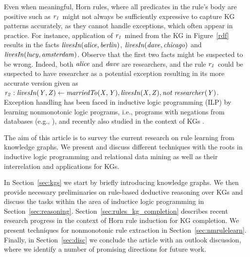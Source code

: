 Even when meaningful, Horn rules, where all predicates in the rule's body are positive such as $\mathit{r_1}$ might not always be sufficiently expressive to capture KG patterns accurately, as they cannot handle exceptions, which often appear in practice. 
For instance, application of $\mathit{r_1}$ mined from the KG in Figure~\ref{rdf} results in the facts $\mathit{livesIn(alice,berlin)}$, $\mathit{livesIn(dave,chicago)}$ and $\mathit{livesIn(lucy,amsterdam)}$. Observe that the first two facts might be suspected to be wrong. Indeed, both $\mathit{alice}$ and $\mathit{dave}$ are researchers, and the rule $\mathit{r_1}$ could be suspected to have researcher as a potential exception resulting in its more accurate version given as $\mathit{r_2:\;}\mathit{livesIn(Y,Z)}\leftarrow \mathit{marriedTo(X,Y),livesIn(X,Z), not\;researcher(Y)}$.
Exception handling has been faced in inductive logic programming (ILP) by learning nonmonotonic logic programs, i.e., programs with negations from databases (e.g., \cite{DBLP:conf/ijcai/InoueK97,DBLP:journals/tocl/Sakama05,XHAIL}), and recently also studied in the context of KGs \cite{gad2016,rumis}.


The aim of this article is to survey the current research on rule learning from knowledge graphs. We present and discuss different techniques with the roots in inductive logic programming and relational data mining as well as their interrelation and applications for KGs. 

In Section~\ref{sec:kgs} we start by briefly introducing knowledge graphs. We then provide necessary preliminaries on rule-based deductive reasoning over KGs and discuss the tasks within the area of inductice logic programming in Section~\ref{sec:reasoning}. Section~\ref{sec:rules_kg_completion} %
describes recent research progress in the context of Horn rule induction for KG completion. We present techniques for nonmonotonic rule extraction in Section~\ref{sec:nmrulelearn}. Finally, in Section~\ref{sec:disc} we conclude the article with an outlook discussion, where we identify a number of promising directions for future work.

